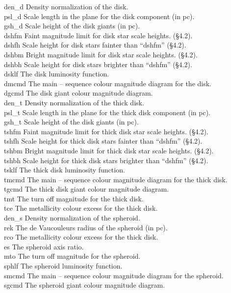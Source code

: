 \documentclass[11pt,twoside]{article}
\begin{document}
\begin{tabbing}
den\_d \> Density normalization of the disk. \\
psl\_d \> Scale length in the plane for the disk component (in pc). \\
gsh\_d \> Scale height of the disk giants (in pc). \\
dshfm \> Faint magnitude limit for disk star scale heights. (\S4.2).\\
dshfh \> Scale height for disk stars fainter than ``dshfm'' (\S4.2). \\
dshbm \> Bright magnitude limit for disk star scale heights. (\S4.2).\\
dshbh \> Scale height for disk stars brighter than ``dshfm'' (\S4.2). \\
dsklf \> The disk luminosity function. \\
dmcmd \> The main -- sequence colour magnitude diagram for the disk. \\
dgcmd \> The disk giant colour magnitude diagram. \\
den\_t \> Density normalization of the thick disk. \\
psl\_t \> Scale length in the plane for the thick disk component (in pc). \\
gsh\_t \> Scale height of the disk giants (in pc). \\
tshfm \> Faint magnitude limit for thick disk star scale heights. (\S4.2).\\
tshfh \> Scale height for thick disk stars fainter than ``dshfm'' (\S4.2). \\
tshbm \> Bright magnitude limit for thick disk star scale heights. (\S4.2).\\
tshbh \> Scale height for thick disk stars brighter than ``dshfm'' (\S4.2). \\
tsklf \> The thick disk luminosity function. \\
tmcmd \> The main -- sequence colour magnitude diagram for the thick disk. \\
tgcmd \> The thick disk giant colour magnitude diagram. \\
tmt \> The turn off magnitude for the thick disk. \\
tce \> The metallicity colour excess for the thick disk. \\
den\_s \> Density normalization of the spheroid. \\
rek \> The de Vaucouleurs radius of the spheroid (in pc). \\
rco \> The metallicity colour excess for the thick disk. \\
es \> The spheroid axis ratio. \\
mto \> The turn off magnitude for the spheroid. \\
sphlf \> The spheroid luminosity function. \\
smcmd \> The main -- sequence colour magnitude diagram for the spheroid. \\
sgcmd \> The spheroid giant colour magnitude diagram. \\
\end{tabbing}
\end{document}
